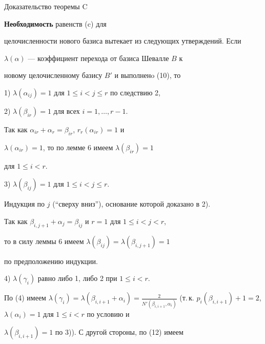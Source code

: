 \begin{pf*}{Доказательство теоремы C}


{\bf Необходимость} равенств (c) для


целочисленности нового базиса вытекает из следующих утверждений. Если


$\lambda(\alpha)$ --- коэффициент перехода от базиса Шевалле $B$ к


новому целочисленному базису $B'$ и выполненo (10), то





1) $\lambda(\alpha_{ij})=1$ для $1\le i<j\le r$ по следствию 2,





2) $\lambda(\beta_{ir})=1$  для всех $i=1,\dotsc,r-1$.





Так как $\alpha_{ir}+\alpha_r=\beta_{ir}$, $r_r(\alpha_{ir})=1$ и


$\lambda(\alpha_{ir})=1$, то по лемме 6 имеем $\lambda(\beta_{ir})=1$


для $1\le i<r$.





3) $\lambda(\beta_{ij})=1$ для $1\le i<j\le r$.





Индукция по $j$ (``сверху вниз''), основание которой доказано в  2).


Так как $\beta_{i,j+1}+\alpha_j=\beta_{ij}$ и $r=1$ для $1\le i<j<r$,


то в силу леммы 6 имеем $\lambda(\beta_{ij})=\lambda(\beta_{i,j+1})=1$


по предположению индукции.





4) $\lambda(\gamma_i)$ равно либо 1, либо 2 при $1\le i<r$.





\noindent{}По (4) имеем $\lambda(\gamma_i)=\lambda(\beta_{i,i+1}+


\alpha_i)=\frac2{N'(\beta_{i,i+1},\alpha_i)}$ (т.\,к. $p_i(\beta_{i,i+1})


+1=2$, $\lambda(\alpha_i)=1$ для $1\le i<r$ по условию и


$\lambda(\beta_{i,i+1})=1$ по 3)). С другой стороны, по (12) имеем



\end{pf*}

